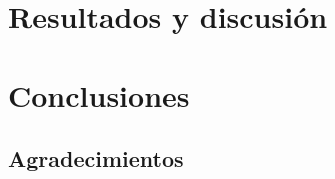 \documentclass[12pt, letterpaper] {article}
\begin{document}
 
\section{Resultados y discusión}


\section{Conclusiones}
  
\subsection*{Agradecimientos}




\end{document}
